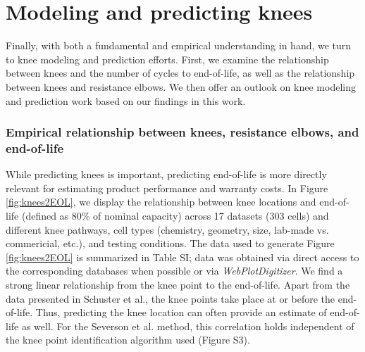 \documentclass[journal=jpclcd,manuscript=article]{achemso}
\newcommand{\ssri}[1]{{
\fbox{
\parbox{0.8\textwidth}{  \fbox{$\triangleright$\textcolor{blue}{\textbf{Shashank}:}} 
#1
}}}}
\newcommand{\pbox}[1]{{
\fbox{
\parbox{0.8\textwidth}{  \fbox{$\triangleright$\textcolor{blue}{\textbf{Peter}:}} 
#1
}}}}
\begin{document}
\section{Modeling and predicting knees}

Finally, with both a fundamental and empirical understanding in hand, we turn to knee modeling and prediction efforts.
First, we examine the relationship between knees and the number of cycles to end-of-life, as well as the relationship between knees and resistance elbows.
We then offer an outlook on knee modeling and prediction work based on our findings in this work.


\subsubsection{Empirical relationship between knees, resistance elbows, and end-of-life}

While predicting knees is important, predicting end-of-life is more directly relevant for estimating product performance and warranty costs. In Figure \ref{fig:knees2EOL}, we display the relationship between knee locations and end-of-life (defined as 80\% of nominal capacity) across 17 datasets (303 cells) and different knee pathways, cell types (chemistry, geometry, size, lab-made vs. commericial, etc.), and testing conditions. The data used to generate Figure \ref{fig:knees2EOL} is summarized in Table SI; data was obtained via direct access to the corresponding databases when possible\cite{baumhofer_production_2014,diao_accelerated_2019,severson_data-driven_2019,willenberg_high-precision_2020,attia_closed-loop_2020} or via \textit{WebPlotDigitizer}\cite{Rohatgi2021}{}.
We find a strong linear relationship from the knee point to the end-of-life. Apart from the data presented in Schuster et al.\cite{schuster_nonlinear_2015}{}, the knee points take place at or before the end-of-life.
Thus, predicting the knee location can often provide an estimate of end-of-life as well.
For the Severson et al.\cite{severson_data-driven_2019} method, this correlation holds independent of the knee point identification algorithm used (Figure S3).
\end{document}
